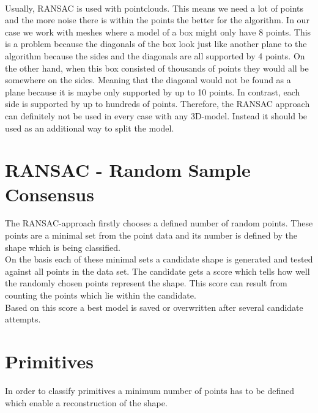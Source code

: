\documentclass[../ClassicThesis.tex]{subfiles}
\begin{document}
\*\\
Usually, RANSAC is used with pointclouds. This means we need a lot of points and the more noise there is within the points the better for the algorithm. In our case we work with meshes where a model of a box might only have 8 points. This is a problem because the diagonals of the box look just like another plane to the algorithm because the sides and the diagonals are all supported by 4 points. 
On the other hand, when this box consisted of thousands of points they would all be somewhere on the sides. Meaning that the diagonal would not be found as a plane because it is maybe only supported by up to 10 points. In contrast, each side is supported by up to hundreds of points. Therefore, the RANSAC approach can definitely not be used in every case with any 3D-model. Instead it should be used as an additional way to split the model.
\section{RANSAC - Random Sample Consensus}
The RANSAC-approach firstly chooses a defined number of random points. These points are a minimal set from the point data and its number is defined by the shape which is being classified.\\
On the basis each of these minimal sets a candidate shape is generated and tested against all points in the data set. The candidate gets a score which tells how well the randomly chosen points represent the shape. This score can result from counting the points which lie within the candidate.\\
Based on this score a best model is saved or overwritten after several candidate attempts.
\section{Primitives}
In order to classify primitives a minimum number of points has to be defined which enable a reconstruction of the shape.
\end{document}
